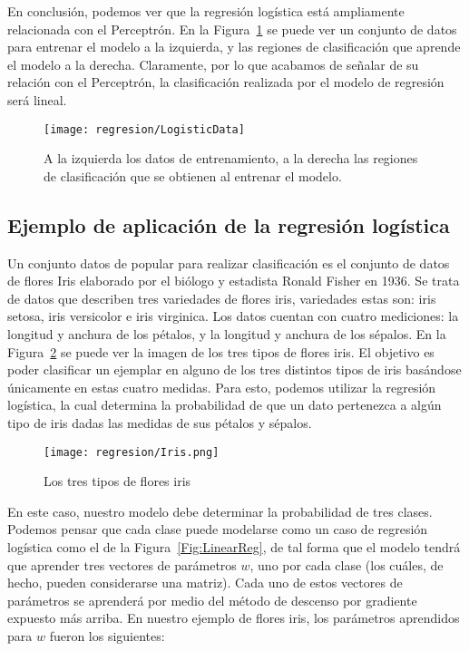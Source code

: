 En conclusión, podemos ver que la regresión logística está ampliamente relacionada con el Perceptrón. En la Figura~\ref{Fig:LogistData} se puede ver un conjunto de datos para entrenar el modelo a la izquierda, y las regiones de clasificación que aprende el modelo a la derecha. Claramente, por lo que acabamos de señalar de su relación con el Perceptrón, la clasificación realizada por el modelo de regresión será lineal.

\begin{figure}
 \centering
 \texttt{[image: regresion/LogisticData]}
 \caption{A la izquierda los datos de entrenamiento, a la derecha las regiones de clasificación que se obtienen al entrenar el modelo.}\label{Fig:LogistData}
\end{figure}


\subsection{Ejemplo de aplicación de la regresión logística}

Un conjunto datos de popular para realizar clasificación es el conjunto de datos de flores Iris elaborado por el biólogo y estadista Ronald Fisher en 1936. Se trata de datos que describen tres variedades de flores iris, variedades estas son: iris setosa, iris versicolor e iris virginica. Los datos cuentan con cuatro mediciones: la longitud y anchura de los pétalos, y la longitud y anchura de los sépalos. En la Figura~\ref{Fig:iris} se puede ver la imagen de los tres tipos de flores iris. El objetivo es poder clasificar un ejemplar en alguno de los tres distintos tipos de iris basándose únicamente en estas cuatro medidas. Para esto, podemos utilizar la regresión logística, la cual determina la probabilidad de que un dato pertenezca a algún tipo de iris dadas las medidas de sus pétalos y sépalos.


\begin{figure}
 \centering
 \texttt{[image: regresion/Iris.png]}
 \caption{Los tres tipos de flores iris}\label{Fig:iris}
\end{figure} 

En este caso, nuestro modelo debe determinar la probabilidad de tres clases. Podemos pensar que cada clase puede modelarse como un caso de regresión logística como el de la Figura~\ref{Fig:LinearReg}, de tal forma que el modelo tendrá que aprender tres vectores de parámetros $w$, uno por cada clase (los cuáles, de hecho, pueden considerarse una matriz). Cada uno de estos vectores de parámetros se aprenderá por medio del método de descenso por gradiente expuesto más arriba. En nuestro ejemplo de flores iris, los parámetros aprendidos para $w$ fueron los siguientes:

